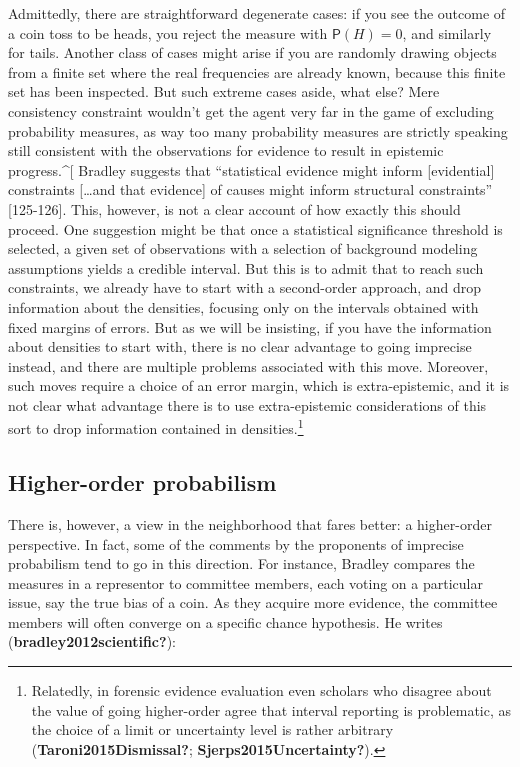 \documentclass[
  letterpaper,
  DIV=11,
  numbers=noendperiod]{scrartcl}
\begin{document}
Admittedly, there are straightforward degenerate cases: if you see the
outcome of a coin toss to be heads, you reject the measure with
\(\mathsf{P}(H)=0\), and similarly for tails. Another class of cases
might arise if you are randomly drawing objects from a finite set where
the real frequencies are already known, because this finite set has been
inspected. But such extreme cases aside, what else? Mere consistency
constraint wouldn't get the agent very far in the game of excluding
probability measures, as way too many probability measures are strictly
speaking still consistent with the observations for evidence to result
in epistemic progress.\^{}{[} Bradley suggests that ``statistical
evidence might inform {[}evidential{]} constraints {[}\dots and that
evidence{]} of causes might inform structural constraints''
{[}125-126{]}. This, however, is not a clear account of how exactly this
should proceed. One suggestion might be that once a statistical
significance threshold is selected, a given set of observations with a
selection of background modeling assumptions yields a credible interval.
But this is to admit that to reach such constraints, we already have to
start with a second-order approach, and drop information about the
densities, focusing only on the intervals obtained with fixed margins of
errors. But as we will be insisting, if you have the information about
densities to start with, there is no clear advantage to going imprecise
instead, and there are multiple problems associated with this move.
Moreover, such moves require a choice of an error margin, which is
extra-epistemic, and it is not clear what advantage there is to use
extra-epistemic considerations of this sort to drop information
contained in densities.\footnote{Relatedly, in forensic evidence
  evaluation even scholars who disagree about the value of going
  higher-order agree that interval reporting is problematic, as the
  choice of a limit or uncertainty level is rather arbitrary
  (\textbf{Taroni2015Dismissal?}; \textbf{Sjerps2015Uncertainty?}).}

\hypertarget{higher-order-probabilism}{%
\subsection{Higher-order probabilism}\label{higher-order-probabilism}}

There is, however, a view in the neighborhood that fares better: a
higher-order perspective. In fact, some of the comments by the
proponents of imprecise probabilism tend to go in this direction. For
instance, Bradley compares the measures in a representor to committee
members, each voting on a particular issue, say the true bias of a coin.
As they acquire more evidence, the committee members will often converge
on a specific chance hypothesis. He writes
(\textbf{bradley2012scientific?}):
\end{document}
